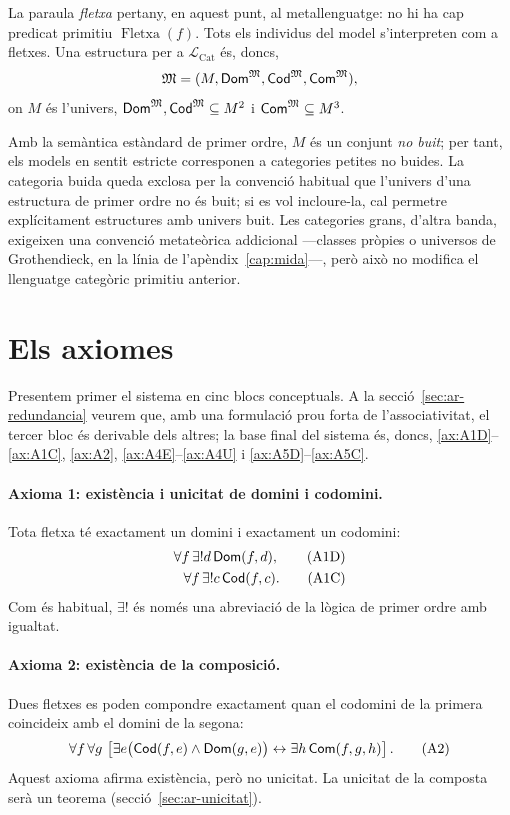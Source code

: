 La paraula \emph{fletxa} pertany, en aquest punt, al metallenguatge: no hi ha cap predicat primitiu $\operatorname{Fletxa}(f)$. Tots els individus del model s'interpreten com a fletxes. Una estructura per a $\mathcal L_{\mathrm{Cat}}$ és, doncs,
\[
\mathfrak M=(M,\mathsf{Dom}^{\mathfrak M},\mathsf{Cod}^{\mathfrak M},\mathsf{Com}^{\mathfrak M}),
\]
on $M$ és l'univers, $\mathsf{Dom}^{\mathfrak M},\mathsf{Cod}^{\mathfrak M}\subseteq M^2$ i $\mathsf{Com}^{\mathfrak M}\subseteq M^3$.

\begin{observacio}[metateòrica]
\label{obs:ar-metateorica}
Amb la semàntica estàndard de primer ordre, $M$ és un conjunt \emph{no buit}; per tant, els models en sentit estricte corresponen a categories petites no buides. La categoria buida queda exclosa per la convenció habitual que l'univers d'una estructura de primer ordre no és buit; si es vol incloure-la, cal permetre explícitament estructures amb univers buit. Les categories grans, d'altra banda, exigeixen una convenció metateòrica addicional ---classes pròpies o universos de Grothendieck, en la línia de l'apèndix~\ref{cap:mida}---, però això no modifica el llenguatge categòric primitiu anterior.
\end{observacio}

\section{Els axiomes}
\label{sec:ar-axiomes}

Presentem primer el sistema en cinc blocs conceptuals. A la secció~\ref{sec:ar-redundancia} veurem que, amb una formulació prou forta de l'associativitat, el tercer bloc és derivable dels altres; la base final del sistema és, doncs, \eqref{ax:A1D}--\eqref{ax:A1C}, \eqref{ax:A2}, \eqref{ax:A4E}--\eqref{ax:A4U} i \eqref{ax:A5D}--\eqref{ax:A5C}.

\paragraph{Axioma 1: existència i unicitat de domini i codomini.}
Tota fletxa té exactament un domini i exactament un codomini:
\begin{align}
\forall f\,\exists!d\,\mathsf{Dom}(f,d),
\tag{A1D}\label{ax:A1D}\\
\forall f\,\exists!c\,\mathsf{Cod}(f,c).
\tag{A1C}\label{ax:A1C}
\end{align}
Com és habitual, $\exists!$ és només una abreviació de la lògica de primer ordre amb igualtat.

\paragraph{Axioma 2: existència de la composició.}
Dues fletxes es poden compondre exactament quan el codomini de la primera coincideix amb el domini de la segona:
\begin{equation}
\forall f\,\forall g\,
\left[
\exists e\bigl(\mathsf{Cod}(f,e)\land\mathsf{Dom}(g,e)\bigr)
\leftrightarrow
\exists h\,\mathsf{Com}(f,g,h)
\right].
\tag{A2}\label{ax:A2}
\end{equation}
Aquest axioma afirma existència, però no unicitat. La unicitat de la composta serà un teorema (secció~\ref{sec:ar-unicitat}).

